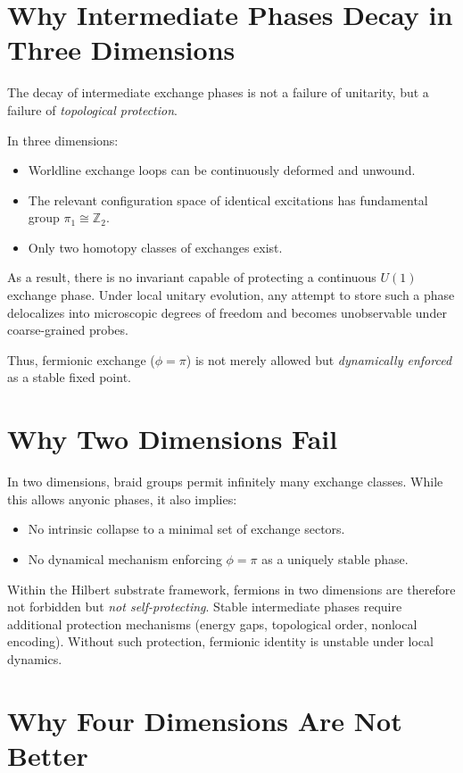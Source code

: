 \documentclass[11pt]{article}
\begin{document}
\section{Why Intermediate Phases Decay in Three Dimensions}

The decay of intermediate exchange phases is not a failure of unitarity, but a failure of \emph{topological protection}.

In three dimensions:
\begin{itemize}
    \item Worldline exchange loops can be continuously deformed and unwound.
    \item The relevant configuration space of identical excitations has fundamental group $\pi_1 \cong \mathbb{Z}_2$.
    \item Only two homotopy classes of exchanges exist.
\end{itemize}

As a result, there is no invariant capable of protecting a continuous $U(1)$ exchange phase. Under local unitary evolution, any attempt to store such a phase delocalizes into microscopic degrees of freedom and becomes unobservable under coarse-grained probes.

Thus, fermionic exchange ($\phi=\pi$) is not merely allowed but \emph{dynamically enforced} as a stable fixed point.

\section{Why Two Dimensions Fail}

In two dimensions, braid groups permit infinitely many exchange classes. While this allows anyonic phases, it also implies:
\begin{itemize}
    \item No intrinsic collapse to a minimal set of exchange sectors.
    \item No dynamical mechanism enforcing $\phi=\pi$ as a uniquely stable phase.
\end{itemize}

Within the Hilbert substrate framework, fermions in two dimensions are therefore not forbidden but \emph{not self-protecting}. Stable intermediate phases require additional protection mechanisms (energy gaps, topological order, nonlocal encoding). Without such protection, fermionic identity is unstable under local dynamics.

\section{Why Four Dimensions Are Not Better}
\end{document}
